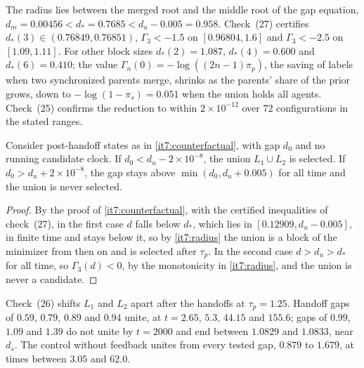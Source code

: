 \documentclass[11pt,letterpaper]{report}
\begin{document}
The radius lies between the merged root and the middle root of the gap equation, $d_m=0.00456<d_*=0.7685<d_u-0.005=0.958$. Check~(27) certifies $d_*(3)\in(0.76849,0.76851)$, $\Gamma_3<-1.5$ on $[0.96804,1.6]$ and $\Gamma_3<-2.5$ on $[1.09,1.11]$. For other block sizes $d_*(2)=1.087$, $d_*(4)=0.600$ and $d_*(6)=0.410$; the value $\Gamma_n(0)=-\log((2n-1)\pi_p)$, the saving of labels when two synchronized parents merge, shrinks as the parents' share of the prior grows, down to $-\log(1-\pi_s)=0.051$ when the union holds all agents. Check~(25) confirms the reduction to within $2\times10^{-12}$ over $72$ configurations in the stated ranges.

Consider post-handoff states as in \cref{it7:counterfactual}, with gap $d_0$ and no running candidate clock. If $d_0<d_u-2\times10^{-8}$, the union $L_1\cup L_2$ is selected. If $d_0>d_u+2\times10^{-8}$, the gap stays above $\min(d_0,d_u+0.005)$ for all time and the union is never selected.
\begin{proof}
By the proof of \cref{it7:counterfactual}, with the certified inequalities of check~(27), in the first case $d$ falls below $d_*$, which lies in $[0.12909,d_u-0.005]$, in finite time and stays below it, so by \cref{it7:radius} the union is a block of the minimizer from then on and is selected after $\tau_p$. In the second case $d>d_u>d_*$ for all time, so $\Gamma_3(d)<0$, by the monotonicity in \cref{it7:radius}, and the union is never a candidate.
\end{proof}

Check~(26) shifts $L_1$ and $L_2$ apart after the handoffs at $\tau_p=1.25$. Handoff gaps of $0.59$, $0.79$, $0.89$ and $0.94$ unite, at $t=2.65$, $5.3$, $44.15$ and $155.6$; gaps of $0.99$, $1.09$ and $1.39$ do not unite by $t=2000$ and end between $1.0829$ and $1.0833$, near $d_s$. The control without feedback unites from every tested gap, $0.879$ to $1.679$, at times between $3.05$ and $62.0$.
\end{document}
